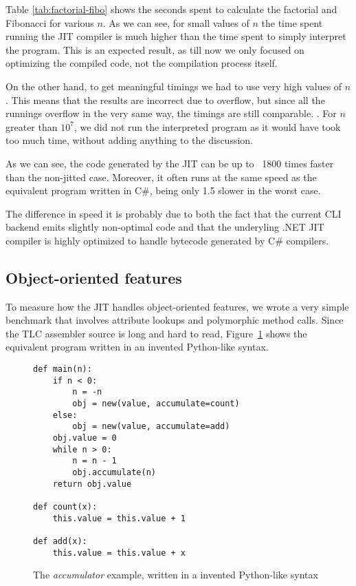 Table \ref{tab:factorial-fibo} shows the seconds spent to calculate
the factorial and Fibonacci for various $n$.  As we can see, for small values
of $n$ the time spent running the JIT compiler is much higher than the time
spent to simply interpret the program.  This is an expected result, as till
now we only focused on optimizing the compiled code, not the compilation
process itself.

On the other hand, to get meaningful timings we had to use very high values of
$n$.  This means that the results are incorrect due to overflow, but since all
the runnings overflow in the very same way, the timings are still
comparable. .  For $n$ greater
than $10^7$, we did not run the interpreted program as it would have took too
much time, without adding anything to the discussion.

As we can see, the code generated by the JIT can be up to ~1800 times faster
than the non-jitted case.  Moreover, it often runs at the same speed as the
equivalent program written in C\#, being only 1.5 slower in the worst case.

The difference in speed it is probably due to both the fact that the current
CLI backend emits slightly non-optimal code and that the underyling .NET JIT
compiler is highly optimized to handle bytecode generated by C\# compilers.

\subsection{Object-oriented features}

To measure how the JIT handles object-oriented features, we wrote a very
simple benchmark that involves attribute lookups and polymorphic method calls.
Since the TLC assembler source is long and hard to read,
Figure~\ref{fig:accumulator} shows the equivalent program written in an
invented Python-like syntax.

\begin{figure}[h]
\begin{center}
\begin{lstlisting}
def main(n):
    if n < 0:
        n = -n
        obj = new(value, accumulate=count)
    else:
        obj = new(value, accumulate=add)
    obj.value = 0
    while n > 0:
        n = n - 1
        obj.accumulate(n)
    return obj.value

def count(x):
    this.value = this.value + 1

def add(x):
    this.value = this.value + x
\end{lstlisting}
\caption{The \emph{accumulator} example, written in a invented Python-like syntax}
\label{fig:accumulator}
\end{center}
\end{figure}

